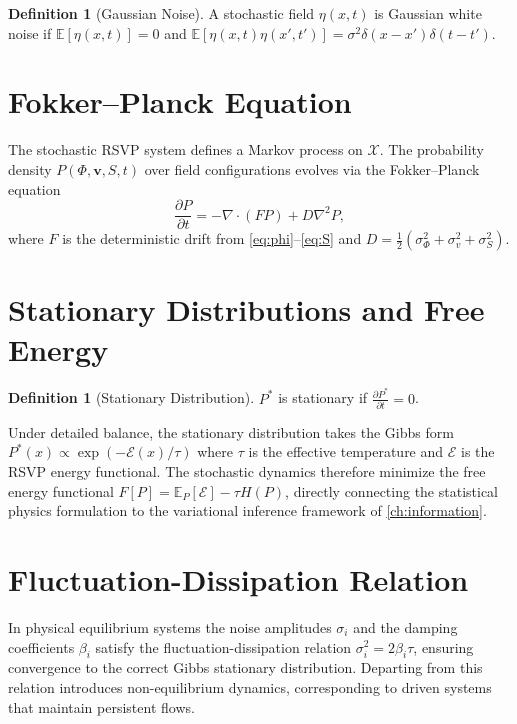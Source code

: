 \documentclass[12pt,a4paper,oneside]{book}
\numberwithin{equation}{chapter}
\theoremstyle{plain}
\theoremstyle{definition}
\newtheorem{definition}[theorem]{Definition}
\theoremstyle{remark}
\begin{document}
\begin{definition}[Gaussian Noise]
A stochastic field $\eta(x,t)$ is Gaussian white noise if
$\mathbb{E}[\eta(x,t)] = 0$ and
$\mathbb{E}[\eta(x,t)\eta(x',t')] = \sigma^2\delta(x-x')\delta(t-t')$.
\end{definition}

\section{Fokker--Planck Equation}

The stochastic RSVP system defines a Markov process on $\mathcal{X}$.
The probability density $P(\Phi,\mathbf{v},S,t)$ over field
configurations evolves via the Fokker--Planck equation
\[
\frac{\partial P}{\partial t}
= -\nabla\cdot(FP) + D\nabla^2 P,
\]
where $F$ is the deterministic drift from \eqref{eq:phi}--\eqref{eq:S}
and $D = \tfrac{1}{2}(\sigma_\Phi^2 + \sigma_v^2 + \sigma_S^2)$.

\section{Stationary Distributions and Free Energy}

\begin{definition}[Stationary Distribution]
$P^\ast$ is stationary if $\frac{\partial P^\ast}{\partial t} = 0$.
\end{definition}

Under detailed balance, the stationary distribution takes the Gibbs
form $P^\ast(x) \propto \exp(-\mathcal{E}(x)/\tau)$ where $\tau$ is
the effective temperature and $\mathcal{E}$ is the RSVP energy
functional. The stochastic dynamics therefore minimize the free energy
functional $F[P] = \mathbb{E}_P[\mathcal{E}] - \tau H(P)$, directly
connecting the statistical physics formulation to the variational
inference framework of \cref{ch:information}.

\section{Fluctuation-Dissipation Relation}

In physical equilibrium systems the noise amplitudes $\sigma_i$ and
the damping coefficients $\beta_i$ satisfy the
fluctuation-dissipation relation $\sigma_i^2 = 2\beta_i\tau$,
ensuring convergence to the correct Gibbs stationary distribution.
Departing from this relation introduces non-equilibrium dynamics,
corresponding to driven systems that maintain persistent flows.
\end{document}
